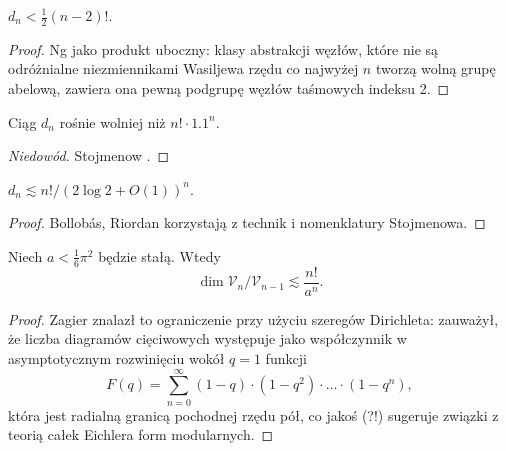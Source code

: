 \begin{proposition}
    $d_n < \frac 12 (n-2)!$.
\end{proposition}

\begin{proof}
%
    Ng \cite{ng1998} jako produkt uboczny: klasy abstrakcji węzłów, które nie są odróżnialne niezmiennikami Wasiljewa rzędu co najwyżej $n$ tworzą wolną grupę abelową, zawiera ona pewną podgrupę węzłów taśmowych indeksu 2.
\end{proof}

\begin{proposition}
    Ciąg $d_n$ rośnie wolniej niż $n! \cdot 1.1
    ^n$.
\end{proposition}

\begin{proof}[Niedowód]
%
    Stojmenow \cite{stoimenow1998}.
\end{proof}

\begin{proposition}
    $d_n \lesssim n! / (2 \log 2 + O(1))^n$.
\end{proposition}

\begin{proof}
%
%
    Bollobás, Riordan \cite{bollobas2000} korzystają z technik i nomenklatury Stojmenowa.
\end{proof}

\begin{proposition}
    Niech $a < \frac 1 6 \pi^2$ będzie stałą.
    Wtedy
    \begin{equation}
        \dim \mathcal V_n / \mathcal V_{n-1} \lesssim \frac{n!}{a^n}.
    \end{equation}
\end{proposition}

\begin{proof}
%
%
    Zagier \cite{zagier2001} znalazł to ograniczenie przy użyciu szeregów Dirichleta: zauważył, że liczba diagramów cięciwowych występuje jako współczynnik w asymptotycznym rozwinięciu wokół $q = 1$ funkcji
    \begin{equation}
        F(q) = \sum_{n=0}^\infty (1-q) \cdot (1-q^2) \cdot \ldots \cdot (1-q^n),
    \end{equation}
    która jest radialną granicą pochodnej rzędu pół, co jakoś (?!) sugeruje związki z teorią całek Eichlera form modularnych.
\end{proof}

